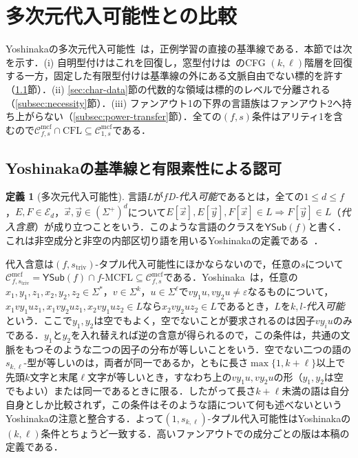 \documentclass[11pt,a4paper]{ltjsarticle}
\numberwithin{equation}{section}
\theoremstyle{plain}
\theoremstyle{definition}
\newtheorem{definition}[theorem]{定義}
\theoremstyle{remark}
\newcommand{\Cmcf}[2]{\mathcal{C}^{\mathrm{mcf}}_{#1,#2}}
\newcommand{\tuple}[1]{\vec{#1}}
\newcommand{\eps}{\varepsilon}
\newcommand{\YSub}[1]{\mathsf{YSub}(#1)}
\begin{document}
\section{多次元代入可能性との比較}
\label{sec:comparison}

Yoshinakaの多次元代入可能性~\cite{Yoshinaka2009,Yoshinaka2011}は，正例学習の直接の基準線である．本節では次を示す．(i) 自明型付けはこれを回復し，窓型付けは~\cite{Yoshinaka2008}のCFG $(k,\ell)$階層を回復する一方，固定した有限型付けは基準線の外にある文脈自由でない標的を許す（\ref{subsec:baseline}節）．(ii) \ref{sec:char-data}節の代数的な領域は標的のレベルで分離される（\ref{subsec:necessity}節）．(iii) ファンアウト1の下界の言語族はファンアウト2へ持ち上がらない（\ref{subsec:power-transfer}節）．全ての$(f,s)$条件はアリティ1を含むので$\Cmcf{f}{s}\cap\mathrm{CFL}\subseteq\Cmcf{1}{s}$である．

\subsection{Yoshinakaの基準線と有限素性による認可}
\label{subsec:baseline}

\begin{definition}[多次元代入可能性]
\label{def:yoshinaka-pd-substitutability}
言語$L$が\emph{$f$D-代入可能}であるとは，全ての$1\le d\le f$，$E,F\in\mathcal E_d$，$\tuple x,\tuple y\in(\Sigma^+)^d$について\(E[\tuple x],E[\tuple y],F[\tuple x]\in L\Rightarrow F[\tuple y]\in L\)（\emph{代入含意}）が成り立つことをいう．このような言語のクラスを$\YSub{f}$と書く．これは非空成分と非空の内部区切り語を用いるYoshinakaの定義である~\cite[Section~3.1 and footnote~3]{Yoshinaka2011}．
\end{definition}

代入含意は$(f,s_{\mathrm{triv}})$-タプル代入可能性にほかならないので，任意の$s$について$\Cmcf{f}{s_{\mathrm{triv}}}=\YSub{f}\cap f\text{-}\mathrm{MCFL}\subseteq\Cmcf{f}{s}$である．Yoshinaka~\cite[Definition~2]{Yoshinaka2008}は，任意の$x_1,y_1,z_1,x_2,y_2,z_2\in\Sigma^*$，$v\in\Sigma^k$，$u\in\Sigma^\ell$で$vy_1u,vy_2u\ne\eps$なるものについて，$x_1vy_1uz_1,x_1vy_2uz_1,x_2vy_1uz_2\in L$なら$x_2vy_2uz_2\in L$であるとき，$L$を\emph{$k,l$-代入可能}という．ここで$y_1,y_2$は空でもよく，空でないことが要求されるのは因子$vy_iu$のみである．$y_1$と$y_2$を入れ替えれば逆の含意が得られるので，この条件は，共通の文脈をもつそのような二つの因子の分布が等しいことをいう．空でない二つの語の$s_{k,\ell}$-型が等しいのは，両者が同一であるか，ともに長さ$\max\{1,k+\ell\}$以上で先頭$k$文字と末尾$\ell$文字が等しいとき，すなわち上の$vy_1u,vy_2u$の形（$y_1,y_2$は空でもよい）または同一であるときに限る．したがって長さ$k+\ell$未満の語は自分自身としか比較されず，この条件はそのような語について何も述べないというYoshinakaの注意と整合する．よって$(1,s_{k,\ell})$-タプル代入可能性はYoshinakaの$(k,\ell)$条件とちょうど一致する．高いファンアウトでの成分ごとの版は本稿の定義である．
\end{document}
